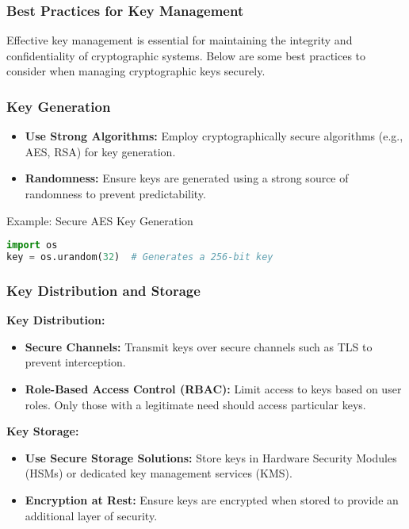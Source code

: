 \documentclass{beamer}
\begin{document}
\begin{frame}[fragile]
    \frametitle{Best Practices for Key Management}
    Effective key management is essential for maintaining the integrity and confidentiality of cryptographic systems. Below are some best practices to consider when managing cryptographic keys securely.
\end{frame}

\begin{frame}[fragile]
    \frametitle{Key Generation}
    \begin{itemize}
        \item \textbf{Use Strong Algorithms:} Employ cryptographically secure algorithms (e.g., AES, RSA) for key generation.
        \item \textbf{Randomness:} Ensure keys are generated using a strong source of randomness to prevent predictability.
    \end{itemize}
    \begin{block}{Example: Secure AES Key Generation}
    \begin{lstlisting}[language=python]
import os
key = os.urandom(32)  # Generates a 256-bit key
    \end{lstlisting}
    \end{block}
\end{frame}

\begin{frame}[fragile]
    \frametitle{Key Distribution and Storage}
    \textbf{Key Distribution:}
    \begin{itemize}
        \item \textbf{Secure Channels:} Transmit keys over secure channels such as TLS to prevent interception.
        \item \textbf{Role-Based Access Control (RBAC):} Limit access to keys based on user roles. Only those with a legitimate need should access particular keys.
    \end{itemize}
    
    \textbf{Key Storage:}
    \begin{itemize}
        \item \textbf{Use Secure Storage Solutions:} Store keys in Hardware Security Modules (HSMs) or dedicated key management services (KMS).
        \item \textbf{Encryption at Rest:} Ensure keys are encrypted when stored to provide an additional layer of security.
    \end{itemize}
\end{frame}
\end{document}
